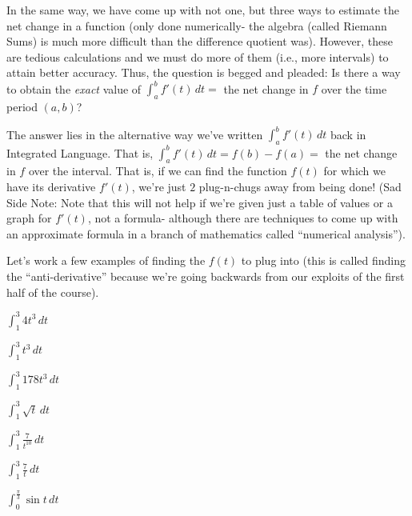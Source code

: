 \documentclass{ximera}
\begin{document}
In the same way, we have come up with not one, but three ways to estimate the net change in a function (only done numerically- the algebra (called Riemann Sums) is much more difficult than the difference quotient was).  However, these are tedious calculations and we must do more of them (i.e., more intervals) to attain better accuracy.  Thus, the question is begged and pleaded:  Is there a way to obtain the {\em exact} value of $\int_a^b f'(t)\, dt  =$ the net change in $f$ over the time period $(a, b)$?

The answer lies in the alternative way we've written $\int_a^b f'(t)\, dt$ back in Integrated Language.  That is, $\int_a^b f'(t)\, dt = f(b) - f(a) =$ the net change in $f$ over the interval.  That is, if we can find the function $f(t)$ for which we have its derivative $f'(t)$, we're just $2$ plug-n-chugs away from being done!  (Sad Side Note:  Note that this will not help if we're given just a table of values or a graph for  $f'(t)$, not a formula- although there are techniques to come up with an approximate formula in a branch of mathematics called ``numerical analysis'').

Let's work a few examples of finding the $f(t)$ to plug into (this is called finding the ``anti-derivative'' because we're going backwards from our exploits of the first half of the course).

\begin{problem}
$\int_1^3 4t^3\, dt$
\end{problem}      

\begin{problem}
$\int_1^3 t^3\, dt$
\end{problem}

\begin{problem}
$\int_1^3 178t^3\, dt$
\end{problem}

\begin{problem}
$\int_1^3 \sqrt{t}\, dt$
\end{problem}

\begin{problem}
$\int_1^3 \frac{7}{t^{10}}\, dt$
\end{problem}

\begin{problem}
$\int_1^3 \frac{7}{t}\, dt$
\end{problem}

\begin{problem}
$\int_0^{\frac{\pi}{3}} \sin t\, dt$
\end{problem}
\end{document}

